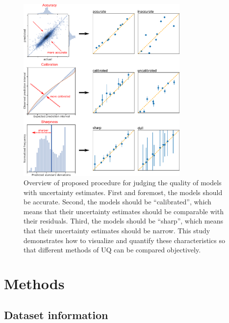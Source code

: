\documentclass[]{achemso}
\begin{document}
\begin{figure}
    \centering
    \includegraphics[width=0.75\textwidth]{intro/intro.pdf}
    \caption{Overview of proposed procedure for judging the quality of models with uncertainty estimates.
    First and foremost, the models should be accurate.
    Second, the models should be ``calibrated'', which means that their uncertainty estimates should be comparable with their residuals.
    Third, the models should be ``sharp'', which means that their uncertainty estimates should be narrow.
    This study demonstrates how to visualize and quantify these characteristics so that different methods of \gls{UQ} can be compared objectively.}\label{fig:overview}
\end{figure}



\section{Methods}

\subsection{Dataset information}
\end{document}
